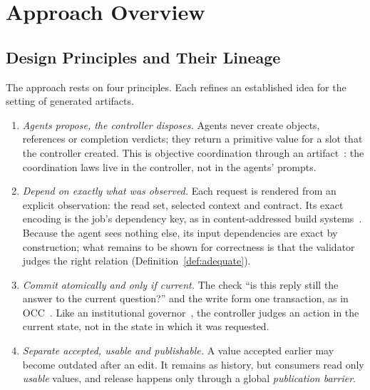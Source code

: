 \section{Approach Overview}\label{sec:overview}

\subsection{Design Principles and Their Lineage}
The approach rests on four principles. Each refines an established idea for the setting of generated artifacts.
\begin{enumerate}
\item \emph{Agents propose, the controller disposes.} Agents never create objects, references or completion verdicts; they return a primitive value for a slot that the controller created. This is objective coordination through an artifact~\cite{omicini2001tuple,omicini2008artifacts}: the coordination laws live in the controller, not in the agents' prompts.
\item \emph{Depend on exactly what was observed.} Each request is rendered from an explicit observation: the read set, selected context and contract. Its exact encoding is the job's dependency key, as in content-addressed build systems~\cite{mokhov}. Because the agent sees nothing else, its input dependencies are exact by construction; what remains to be shown for correctness is that the validator judges the right relation (Definition~\ref{def:adequate}).
\item \emph{Commit atomically and only if current.} The check ``is this reply still the answer to the current question?'' and the write form one transaction, as in OCC~\cite{occ}. Like an institutional governor~\cite{esteva2001institutions}, the controller judges an action in the current state, not in the state in which it was requested.
\item \emph{Separate accepted, usable and publishable.} A value accepted earlier may become outdated after an edit. It remains as history, but consumers read only \emph{usable} values, and release happens only through a global \emph{publication barrier}.
\end{enumerate}

